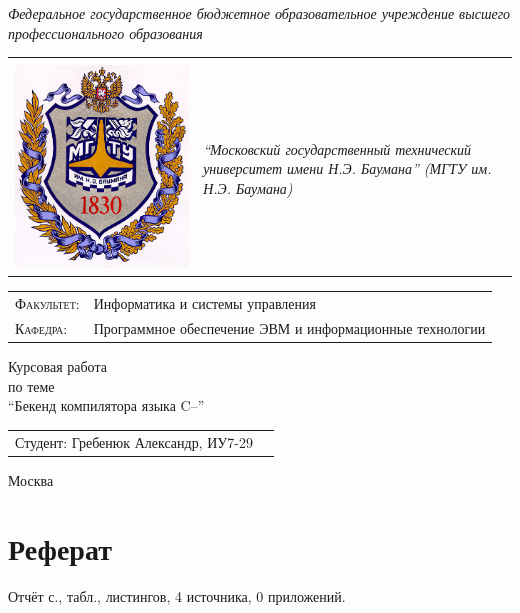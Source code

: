 \documentclass[a4paper,12pt]{report}
\date{\today}
\numberwithin{equation}{section}
\begin{document}
 

\begin{titlepage}
  \begin{center}
    \emph{Федеральное государственное бюджетное образовательное учреждение высшего
      профессионального образования}
    \begin{tabu} to \linewidth {lX[1,c,m]}
      \hline \\
      \includegraphics[width=0.15\linewidth]{img/crest} &
      \large\emph{``Московский государственный технический университет имени Н.Э.
        Баумана'' (МГТУ им. Н.Э. Баумана)} \\
    \end{tabu}
  \end{center}
  \begin{tabu}{ll}
    \large\textsc{Факультет:} & Информатика и системы управления \\
    \large\textsc{Кафедра:} & Программное обеспечение ЭВМ и информационные технологии \\
  \end{tabu}
  \vspace{1.0cm}
  \begin{center}
    \huge{Курсовая работа} \\
    \vspace{0.5cm}
    \small{по теме} \\
    \vspace{0.5cm}
    \Large{``Бекенд компилятора языка C--''}
  \end{center}
  \vfill
  \begin{tabu} to \linewidth {Xr}
    Студент: Гребенюк Александр, ИУ7-29& \\
  \end{tabu}
  \vspace{0.2cm}
  \begin{center}
    Москва \the\year
  \end{center}
\end{titlepage}
\restoregeometry

\setcounter{page}{2}

\section*{Реферат}
Отчёт \pageref{LastPage}с., \totaltables табл., \totallstlistings листингов, 4 источника, 0 приложений.
\end{document}
